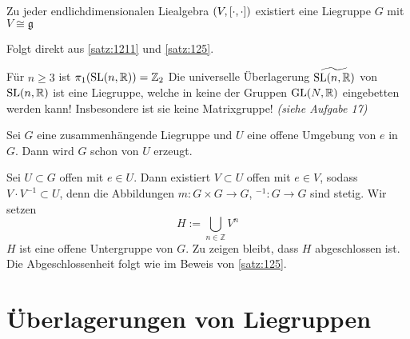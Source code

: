 \begin{korollar}[{name=[{Zu jeder endlichdimensionalen Liealgebra existiert eine Liegruppe}]}]
	Zu jeder endlichdimensionalen Liealgebra $(V,\benbrace*{\cdot ,\cdot })$ existiert eine Liegruppe $G$ mit $V \cong \mathfrak{g}$
\end{korollar}
\begin{beweis}
	Folgt direkt aus \autoref{satz:1211} und \autoref{satz:125}.
\end{beweis}

\begin{bemerkung*}[{name=[{Existenz von Liegruppen, die keine Matrixgruppe ist}]}]
	Für $n \ge 3$ ist $\pi_1 \enbrace*{\SL(n,\mathbb{R})} = \mathbb{Z}_2$
	Die universelle Überlagerung $\widetilde{\SL(n,\mathbb{R})}$ von $\SL(n,\mathbb{R})$ ist eine Liegruppe, welche in keine der Gruppen $\GL(N,\mathbb{R})$ eingebetten werden kann! Insbesondere ist sie keine Matrixgruppe! \emph{(siehe Aufgabe 17)}
\end{bemerkung*}

\begin{lemma}[label=lem:1213,{name=[{Zusammenhängede Liegruppe von Umgebung der Eins erzeugt}]}]
    Sei $G$ eine zusammenhängende Liegruppe und $U$ eine offene Umgebung von $e$ in $G$.
    Dann wird $G$ schon von $U$ erzeugt.
\end{lemma}
\begin{beweis}
    Sei $U \subset G$ offen mit $e \in U$.
    Dann existiert $V \subset U$ offen mit $e \in V$, sodass $V \cdot V^{-1} \subset U$, denn die Abbildungen $m \colon G \times G \to G$, $^{-1} \colon G \to G$ sind stetig.
    Wir setzen 
    \[
        H := \bigcup_{n \in \mathbb{Z}} V^n
    \]
    $H$ ist eine offene Untergruppe von $G$.
    Zu zeigen bleibt, dass $H$ abgeschlossen ist.
    Die Abgeschlossenheit folgt wie im Beweis von \autoref{satz:125}.
\end{beweis}

\section{Überlagerungen von Liegruppen} %
\label{sec:13}

